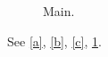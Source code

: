 \documentclass{article}
\begin{document}
\begin{figure}
\subfigure[]{\rule{1cm}{1cm}\label{a}}
\subfigure{\rule{1cm}{1cm}\label{b}}
\caption{Main.}\label{f}
\end{figure}
See \ref{a}, \ref{b}, \ref{c}, \ref{f}.
\end{document}
